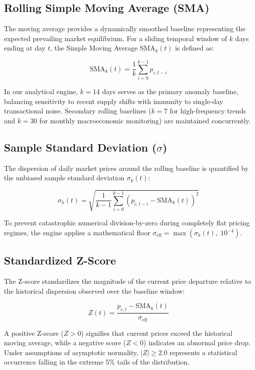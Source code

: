 \subsection{Rolling Simple Moving Average (SMA)}
The moving average provides a dynamically smoothed baseline representing the expected prevailing market equilibrium. For a sliding temporal window of $k$ days ending at day $t$, the Simple Moving Average $\text{SMA}_k(t)$ is defined as:

\begin{equation}
\text{SMA}_k(t) = \frac{1}{k} \sum_{i=0}^{k-1} p_{c,t-i}
\end{equation}

In our analytical engine, $k = 14$ days serves as the primary anomaly baseline, balancing sensitivity to recent supply shifts with immunity to single-day transactional noise. Secondary rolling baselines ($k = 7$ for high-frequency trends and $k = 30$ for monthly macroeconomic monitoring) are maintained concurrently.

\subsection{Sample Standard Deviation ($\sigma$)}
The dispersion of daily market prices around the rolling baseline is quantified by the unbiased sample standard deviation $\sigma_k(t)$:

\begin{equation}
\sigma_k(t) = \sqrt{\frac{1}{k - 1} \sum_{i=0}^{k-1} \left( p_{c,t-i} - \text{SMA}_k(t) \right)^2 }
\end{equation}

To prevent catastrophic numerical division-by-zero during completely flat pricing regimes, the engine applies a mathematical floor $\sigma_{\text{eff}} = \max(\sigma_k(t), \; 10^{-4})$.

\subsection{Standardized Z-Score}
The Z-score standardizes the magnitude of the current price departure relative to the historical dispersion observed over the baseline window:

\begin{equation}
Z(t) = \frac{p_{c,t} - \text{SMA}_k(t)}{\sigma_{\text{eff}}}
\end{equation}

A positive Z-score ($Z > 0$) signifies that current prices exceed the historical moving average, while a negative score ($Z < 0$) indicates an abnormal price drop. Under assumptions of asymptotic normality, $|Z| \ge 2.0$ represents a statistical occurrence falling in the extreme 5\% tails of the distribution.

